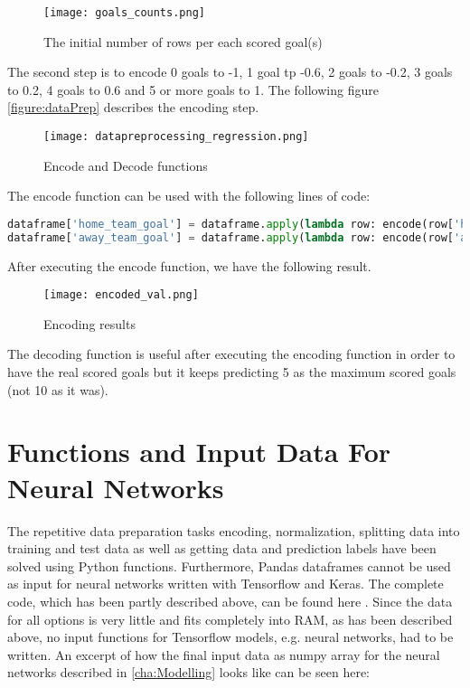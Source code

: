 \begin{figure}[H]
\begin{center}
\texttt{[image: goals\_counts.png]}
\end{center}
\caption{The initial number of rows per each scored goal(s)}
\label{figure:goals_counts}
\end{figure}


The second step is to encode 0 goals to -1, 1 goal tp -0.6, 2 goals to -0.2, 3 goals to 0.2, 4 goals to 0.6 and 5 or more goals to 1.
The following figure \autoref{figure:dataPrep} describes the encoding step.\newline
\begin{figure}[H]
\begin{center}
\texttt{[image: datapreprocessing\_regression.png]}
\end{center}
\caption{Encode and Decode functions}
\label{figure:dataPrep}
\end{figure}



The encode function can be used with the following lines of code:

\begin{lstlisting}[language=Python, caption=Scored goals Python code for encoding classes]
dataframe['home_team_goal'] = dataframe.apply(lambda row: encode(row['home_team_goal']), axis=1)
dataframe['away_team_goal'] = dataframe.apply(lambda row: encode(row['away_team_goal']), axis=1)
\end{lstlisting}


After executing the encode function, we have the following result.

\begin{figure}[H]
\begin{center}
\texttt{[image: encoded\_val.png]}
\end{center}
\caption{Encoding results}
\label{figure:encoding}
\end{figure}


The decoding function is useful after executing the encoding function in order to have the real scored goals but it keeps predicting 5 as the maximum scored goals (not 10 as it was).



\section {Functions and Input Data For Neural Networks}
The repetitive data preparation tasks encoding, normalization, splitting data into training and test data as well as getting data and prediction labels have been solved using Python functions. Furthermore, Pandas dataframes cannot be used as input for neural networks written with Tensorflow and Keras. The complete code, which has been partly described above, can be found here \cite{colab_nn}.
\newline
Since the data for all options is very little and fits completely into RAM, as has been described above, no input functions for Tensorflow models, e.g. neural networks, had to be written. An excerpt of how the final input data as numpy array for the neural networks described in \autoref{cha:Modelling} looks like can be seen here:

